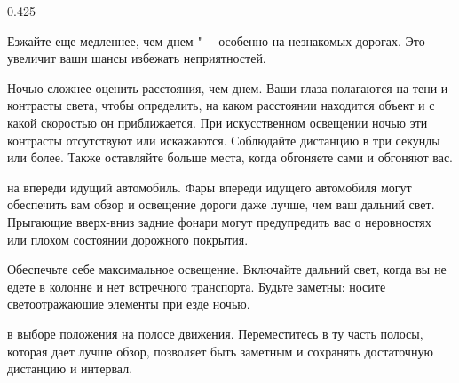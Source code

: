 \begin{langblock}{0.425}
\begin{rus}
		\begin{description} [noitemsep]
			\item [Снизить скорость] Езжайте еще медленнее, чем днем "--- особенно на незнакомых дорогах. Это увеличит ваши шансы избежать неприятностей.
			\item [Увеличьте дистанцию] Ночью сложнее оценить расстояния, чем днем. Ваши глаза полагаются на тени и контрасты света, чтобы определить, на каком расстоянии находится объект и с какой скоростью он приближается. При искусственном освещении ночью эти контрасты отсутствуют или искажаются. Соблюдайте дистанцию в три секунды или более. Также оставляйте больше места, когда обгоняете сами и обгоняют вас.
			\item [Ориентируйтесь] на впереди идущий автомобиль. Фары впереди идущего автомобиля могут обеспечить вам обзор и освещение дороги даже лучше, чем ваш дальний свет. Прыгающие вверх-вниз задние фонари могут предупредить вас о неровностях или плохом состоянии дорожного покрытия.
			\item[Используйте дальний свет] Обеспечьте себе максимальное освещение. Включайте дальний свет, когда вы не едете в колонне и нет встречного транспорта. Будьте заметны: носите светоотражающие элементы при езде ночью.
			\item [Будьте гибкими] в выборе положения на полосе движения. Переместитесь в ту часть полосы, которая дает лучше обзор, позволяет быть заметным и сохранять достаточную дистанцию и интервал.
		\end{description}
\end{rus}
\end{langblock}









